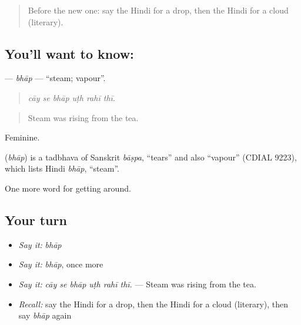 \label{lesson:HI-C436-bhap}



\begin{quote}
Before the new one: say the Hindi for a drop, then the Hindi for a cloud (literary).
\end{quote}

\subsection*{You'll want to know: }
\textbf{} — \emph{bhāp} — \textquotedblleft{}steam; vapour\textquotedblright{}.

\begin{quote}
     
\end{quote}

\begin{quote}
\emph{cāy se bhāp uṭh rahī thī.}
\end{quote}

\begin{quote}
Steam was rising from the tea.
\end{quote}

Feminine.

\begin{cousinweb}
\textbf{} (\emph{bhāp}) is a tadbhava of Sanskrit \emph{bāṣpa}, \textquotedblleft{}tears\textquotedblright{} and also \textquotedblleft{}vapour\textquotedblright{} (CDIAL 9223), which lists Hindi \emph{bhāp}, \textquotedblleft{}steam\textquotedblright{}.
\end{cousinweb}

\begin{grammarlens}[title={What you've built}]
One more word for getting around.
\end{grammarlens}

\subsection*{Your turn}
\begin{itemize}
\raggedright
  \item \emph{Say it:} \emph{bhāp}
  \item \emph{Say it:} \emph{bhāp}, once more
  \item \emph{Say it:} \emph{cāy se bhāp uṭh rahī thī.} — Steam was rising from the tea.
  \item \emph{Recall:} say the Hindi for a drop, then the Hindi for a cloud (literary), then say \emph{bhāp} again
\end{itemize}

